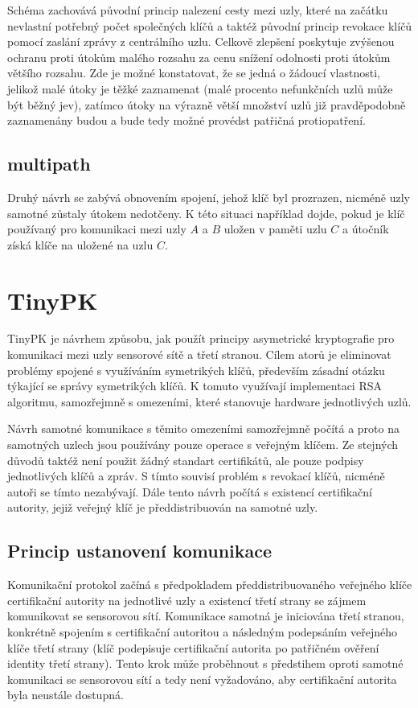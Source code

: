 \documentclass[11pt,final,twoside]{fithesis2}
\begin{document}
Schéma zachovává původní princip nalezení cesty mezi uzly, které na začátku nevlastní potřebný počet společných klíčů a taktéž původní princip revokace klíčů pomocí zaslání zprávy z 
centrálního uzlu. Celkově zlepšení poskytuje zvýšenou ochranu proti útokům malého rozsahu za cenu snížení odolnosti proti útokům většího rozsahu. Zde je možné konstatovat, že se jedná 
o žádoucí vlastnosti, jelikož malé útoky je těžké zaznamenat (malé procento nefunkčních uzlů může být běžný jev), zatímco útoky na výrazně větší množství uzlů již pravděpodobně zaznamenány budou a 
bude tedy možné provédst patřičná protiopatření. 

\subsection{multipath}
Druhý návrh se zabývá obnovením spojení, jehož klíč byl prozrazen, nicméně uzly samotné zůstaly útokem nedotčeny. K této situaci například dojde, pokud je klíč používaný pro komunikaci mezi
uzly $A$ a $B$ uložen v paměti uzlu $C$ a útočník získá klíče na uložené na uzlu $C$. 

\section{TinyPK}
TinyPK\cite{Watro2004} je návrhem způsobu, jak použít principy asymetrické kryptografie 
pro komunikaci mezi uzly sensorové sítě a třetí stranou. Cílem atorů je eliminovat problémy spojené s využíváním 
symetrikých klíčů, především zásadní otázku týkající se správy symetrikých klíčů. K tomuto využívají
implementaci RSA algoritmu\cite{Rivest1978}, samozřejmně s omezeními, které stanovuje hardware jednotlivých uzlů.

Návrh samotné komunikace s těmito omezeními samozřejmně počítá a proto na samotných uzlech jsou používány
pouze operace s veřejným klíčem. Ze stejných důvodů taktéž není použit žádný standart certifikátů, ale 
pouze podpisy jednotlivých klíčů a zpráv. S tímto souvisí problém s revokací klíčů, nicméně autoři se tímto nezabývají.
Dále tento návrh počítá s existencí certifikační autority, jejiž veřejný klíč je předdistribuován na samotné uzly. 

\subsection{Princip ustanovení komunikace}
Komunikační protokol začíná s předpokladem předdistribuovaného veřejného klíče certifikační autority na jednotlivé
uzly a existencí třetí strany se zájmem komunikovat se sensorovou sítí. Komunikace samotná je iniciována třetí
stranou, konkrétně spojením s certifikační autoritou a následným podepsáním veřejného klíče třetí strany (klíč podepisuje 
certifikační autorita po patřičném ověření identity třetí strany). Tento krok může proběhnout s předstihem oproti samotné 
komunikaci se sensorovou sítí a tedy není vyžadováno, aby certifikační autorita byla neustále dostupná. 
\end{document}

